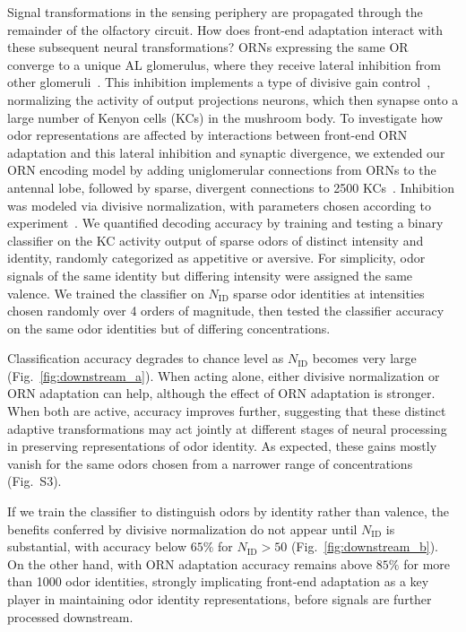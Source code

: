\documentclass[10pt,prl,aps,showpacs,twocolumn,unsortedaddress]{revtex4-1}
\begin{document}
Signal transformations in the sensing periphery are propagated through the remainder of the olfactory circuit. How does front-end adaptation interact with these subsequent neural transformations? ORNs expressing the same OR converge to a unique AL glomerulus, where they receive lateral inhibition from other glomeruli~\cite{lateral_inh, lateral_inh_asahina}. This inhibition implements a type of divisive gain control~\cite{divisive_normalization}, normalizing the activity of output projections neurons, which then synapse onto a large number of Kenyon cells (KCs) in the mushroom body. To investigate how odor representations are affected by interactions between front-end ORN adaptation and this lateral inhibition and synaptic divergence, we extended our ORN encoding model by adding uniglomerular connections from ORNs to the antennal lobe, followed by sparse, divergent connections to 2500 KCs~\cite{memory_review, litwinkumar, abbott_axel}. Inhibition was modeled via divisive normalization, with parameters chosen according to experiment~\cite{divisive_normalization}.
We quantified decoding accuracy by training and testing a binary classifier on the KC activity output of sparse odors of distinct intensity and identity, randomly categorized as appetitive or aversive. For simplicity, odor signals of the same identity but differing intensity were assigned the same valence. We trained the classifier on $N_{{\text {ID}}}$ sparse odor identities at intensities chosen randomly over 4 orders of magnitude, then tested the classifier accuracy on the same odor identities but of differing concentrations. 

Classification accuracy degrades to chance level as $N_{\text {ID}}$ becomes very large (Fig.~\ref{fig:downstream_a}). When acting alone, either divisive normalization or ORN adaptation can help, although the effect of ORN adaptation is stronger. When both are active, accuracy improves further, suggesting that these distinct adaptive transformations may act jointly at different stages of neural processing in preserving representations of odor identity. As expected, these gains mostly vanish for the same odors chosen from a narrower range of concentrations (Fig.~S3).

If we train the classifier to distinguish odors by identity rather than valence, the benefits conferred by divisive normalization do not appear until $N_{{\text {ID}}}$ is substantial, with accuracy below $65\%$ for $N_{{\text {ID}}} > 50$ (Fig.~\ref{fig:downstream_b}). On the other hand, with ORN adaptation accuracy remains above $85\%$ for more than 1000 odor identities, strongly implicating front-end adaptation as a key player in maintaining odor identity representations, before signals are further processed downstream. 
\end{document}

